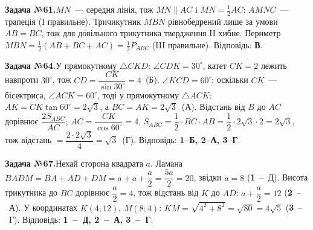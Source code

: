 \documentclass[12pt]{article}
\begin{document}
\par\vspace{0.3cm}\noindent\hypertarget{sol:61}{}
\begin{tcolorbox}[colback=titleBg!40, colframe=mainGreen!55, boxrule=0.4pt, arc=2pt, left=6pt, right=6pt, top=4pt, bottom=4pt, breakable]
\noindent\small\textbf{Задача №61.}\quad $MN$~--- середня лінія, тож $MN\parallel AC$ і $MN=\tfrac12 AC$: $AMNC$~--- трапеція (I правильне). Тричикутник $MBN$ рівнобедрений лише за умови $AB=BC$, тож для довільного трикутника твердження II хибне. Периметр $MBN=\tfrac12(AB+BC+AC)=\tfrac12 P_{ABC}$ (III правильне). Відповідь: \textbf{В}.
\par\vspace{0.1cm}\hfill\hyperlink{task:61}{}
\end{tcolorbox}
\par\vspace{0.3cm}\noindent\hypertarget{sol:64}{}
\begin{tcolorbox}[colback=titleBg!40, colframe=mainGreen!55, boxrule=0.4pt, arc=2pt, left=6pt, right=6pt, top=4pt, bottom=4pt, breakable]
\noindent\small\textbf{Задача №64.}\quad У прямокутному $\triangle CKD$: $\angle CDK=30^\circ$, катет $CK=2$ лежить навпроти $30^\circ$, тож $CD=\dfrac{CK}{\sin 30^\circ}=4$~(Б). $\angle KCD=60^\circ$; оскільки $CK$~--- бісектриса, $\angle ACK=60^\circ$, тоді у прямокутному $\triangle ACK$: $AK=CK\tan 60^\circ=2\sqrt{3}$, а $BC=AK=2\sqrt{3}$~(А). Відстань від $B$ до $AC$ дорівнює $\dfrac{2S_{ABC}}{AC}$; $AC=\dfrac{CK}{\cos 60^\circ}=4$, $S_{ABC}=\dfrac{1}{2}\cdot BC\cdot AB=\dfrac{1}{2}\cdot 2\sqrt{3}\cdot 2=2\sqrt{3}$, тож відстань $=\dfrac{2\cdot 2\sqrt{3}}{4}=\sqrt{3}$~(Г). Відповідь: \textbf{1--Б, 2--А, 3--Г}.
\par\vspace{0.1cm}\hfill\hyperlink{task:64}{}
\end{tcolorbox}
\par\vspace{0.3cm}\noindent\hypertarget{sol:67}{}
\begin{tcolorbox}[colback=titleBg!40, colframe=mainGreen!55, boxrule=0.4pt, arc=2pt, left=6pt, right=6pt, top=4pt, bottom=4pt, breakable]
\noindent\small\textbf{Задача №67.}\quad Нехай сторона квадрата $a$. Ламана $BADM=BA+AD+DM=a+a+\dfrac a2=\dfrac{5a}{2}=20$, звідки $a=8$ (\textbf{1}~--~Д). Висота трикутника до $BC$ дорівнює $\dfrac a2=4$, тож відстань від $K$ до $AD$: $a+\dfrac a2=12$ (\textbf{2}~--~А). У координатах $K(4;12)$, $M(8;4)$: $KM=\sqrt{4^2+8^2}=\sqrt{80}=4\sqrt5$ (\textbf{3}~--~Г). Відповідь: \textbf{1~--~Д, 2~--~А, 3~--~Г}.
\par\vspace{0.1cm}\hfill\hyperlink{task:67}{}
\end{tcolorbox}
\end{document}
